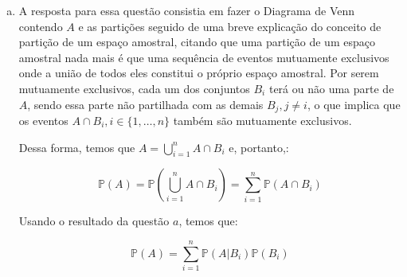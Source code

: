\documentclass[12pt]{article}
\begin{document}
\begin{enumerate}[a)]
    O fato de $A$ e $B$ serem mutuamente exclusivos implica que não podem ocorrer ao mesmo tempo. Logo, se um deles ocorre, o outro automaticamente não pode ocorrer. 

    \item 
    A resposta para essa questão consistia em  fazer o Diagrama de Venn contendo $A$ e as partições seguido de uma breve explicação do conceito de partição de um espaço amostral, citando
    que uma partição de um espaço amostral nada mais é que uma sequência de eventos mutuamente exclusivos onde a união de todos eles constitui o próprio espaço amostral. 
    Por serem mutuamente exclusivos, cada um dos conjuntos $B_i$ terá ou não uma parte de $A$, sendo essa parte não partilhada com as demais $B_j, j\neq i$, o que implica
    que os eventos $A \cap B_i, i \in \{1, \dots, n\}$ também são mutuamente exclusivos. 

    Dessa forma, temos que $A = \displaystyle\bigcup_{i=1}^n A \cap B_i$ e, portanto,:

    $$\mathds{P}(A) = \mathds{P}\left( \bigcup_{i=1}^n A \cap B_i \right) =\sum_{i=1}^n \mathds{P}(A \cap B_i)$$

    Usando o resultado da questão $a$, temos que:

    $$\mathds{P}(A) = \sum_{i=1}^n \mathds{P}(A |B_i) \mathds{P}(B_i)$$

    
\end{enumerate}
\end{document}
